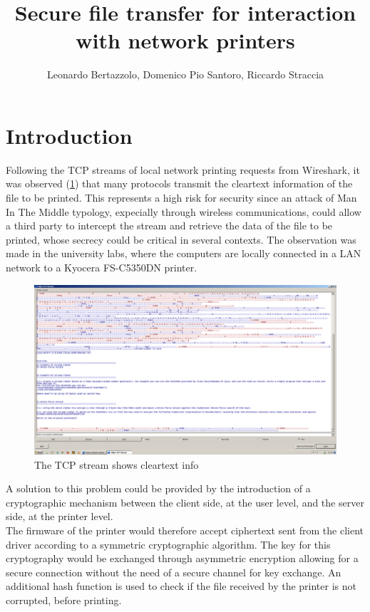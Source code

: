 \documentclass[]{report}
\title{\textbf{  Secure file transfer for interaction with network printers }}
\author{Leonardo Bertazzolo, Domenico Pio Santoro, Riccardo Straccia}
\begin{document}
\maketitle

	
\section*{Introduction}

Following the TCP streams of local network printing requests from Wireshark, it was observed (\ref{fig:tcp1}) that many protocols transmit the cleartext information of the file to be printed. This represents a high risk for security since an attack of Man In The Middle typology, expecially through wireless communications, could allow a third party to intercept the stream and retrieve the data of the file to be printed, whose secrecy could be critical in several contexts.
The observation was made in the university labs, where the computers are locally connected in a LAN network to a Kyocera FS-C5350DN printer.\\

\begin{figure}[!htb]
	\includegraphics[width=\linewidth]{plaintext.png}
	\caption{The TCP stream shows cleartext info}
	\label{fig:tcp1}
\end{figure}

A solution to this problem could be provided by the introduction of a cryptographic mechanism between the client side, at the user level, and the server side, at the printer level.\\

The firmware of the printer would therefore accept ciphertext sent from the client driver according to a symmetric cryptographic algorithm. The key for this cryptography would be exchanged through asymmetric encryption allowing for a secure connection without the need of a secure channel for key exchange. An additional hash function is used to check if the file received by the printer is not corrupted, before printing.\\
\end{document}
